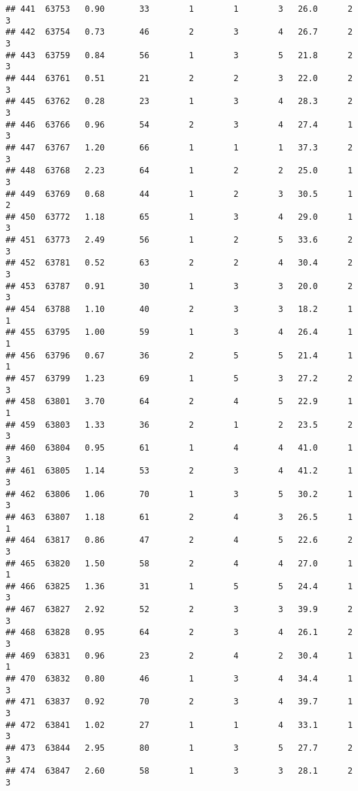 \documentclass[
]{article}
\begin{document}
\begin{verbatim}
## 441  63753   0.90       33        1        1        3   26.0      2      3
## 442  63754   0.73       46        2        3        4   26.7      2      3
## 443  63759   0.84       56        1        3        5   21.8      2      3
## 444  63761   0.51       21        2        2        3   22.0      2      3
## 445  63762   0.28       23        1        3        4   28.3      2      3
## 446  63766   0.96       54        2        3        4   27.4      1      3
## 447  63767   1.20       66        1        1        1   37.3      2      3
## 448  63768   2.23       64        1        2        2   25.0      1      3
## 449  63769   0.68       44        1        2        3   30.5      1      2
## 450  63772   1.18       65        1        3        4   29.0      1      3
## 451  63773   2.49       56        1        2        5   33.6      2      3
## 452  63781   0.52       63        2        2        4   30.4      2      3
## 453  63787   0.91       30        1        3        3   20.0      2      3
## 454  63788   1.10       40        2        3        3   18.2      1      1
## 455  63795   1.00       59        1        3        4   26.4      1      1
## 456  63796   0.67       36        2        5        5   21.4      1      1
## 457  63799   1.23       69        1        5        3   27.2      2      3
## 458  63801   3.70       64        2        4        5   22.9      1      1
## 459  63803   1.33       36        2        1        2   23.5      2      3
## 460  63804   0.95       61        1        4        4   41.0      1      3
## 461  63805   1.14       53        2        3        4   41.2      1      3
## 462  63806   1.06       70        1        3        5   30.2      1      3
## 463  63807   1.18       61        2        4        3   26.5      1      1
## 464  63817   0.86       47        2        4        5   22.6      2      3
## 465  63820   1.50       58        2        4        4   27.0      1      1
## 466  63825   1.36       31        1        5        5   24.4      1      3
## 467  63827   2.92       52        2        3        3   39.9      2      3
## 468  63828   0.95       64        2        3        4   26.1      2      3
## 469  63831   0.96       23        2        4        2   30.4      1      1
## 470  63832   0.80       46        1        3        4   34.4      1      3
## 471  63837   0.92       70        2        3        4   39.7      1      3
## 472  63841   1.02       27        1        1        4   33.1      1      3
## 473  63844   2.95       80        1        3        5   27.7      2      3
## 474  63847   2.60       58        1        3        3   28.1      2      3

\end{verbatim}
\end{document}
